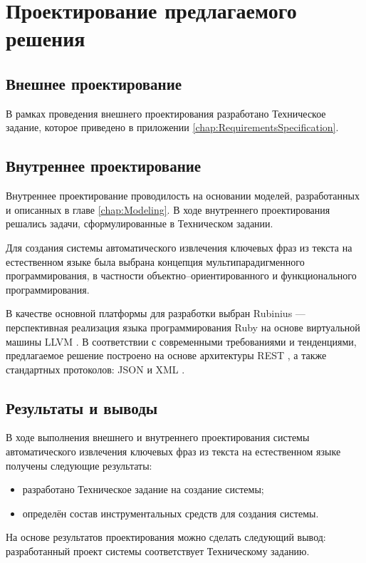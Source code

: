 \chapter{Проектирование предлагаемого решения}
\label{chap:Designing}

\section{Внешнее проектирование}
В рамках проведения внешнего проектирования разработано Техническое
задание, которое приведено в приложении
\ref{chap:RequirementsSpecification}.

\section{Внутреннее проектирование}
Внутреннее проектирование проводилость на основании моделей,
разработанных и описанных в главе \ref{chap:Modeling}. В ходе
внутреннего проектирования решались задачи, сформулированные
в Техническом задании.

Для создания системы автоматического извлечения ключевых фраз из текста
на естественном языке была выбрана концепция мультипарадигменного
программирования, в частности объектно--ориентированного и
функционального программирования.

В качестве основной платформы для разработки выбран Rubinius —
перспективная реализация языка программирования Ruby \cite{Ruby}
на основе виртуальной машины LLVM \cite{Rubinius}. В соответствии с
современными требованиями и тенденциями, предлагаемое решение
построено на основе архитектуры REST \cite{Fielding00}, а также
стандартных протоколов: JSON \cite{JSON} и XML \cite{XML}.

\section{Результаты и выводы}
В ходе выполнения внешнего и внутреннего проектирования системы
автоматического извлечения ключевых фраз из текста на естественном языке
получены следующие результаты:
\begin{itemize}
  \item разработано Техническое задание на создание системы;
  \item определён состав инструментальных средств для создания
системы.
\end{itemize}

На основе результатов проектирования можно сделать следующий
вывод: разработанный проект системы соответствует Техническому
заданию.
